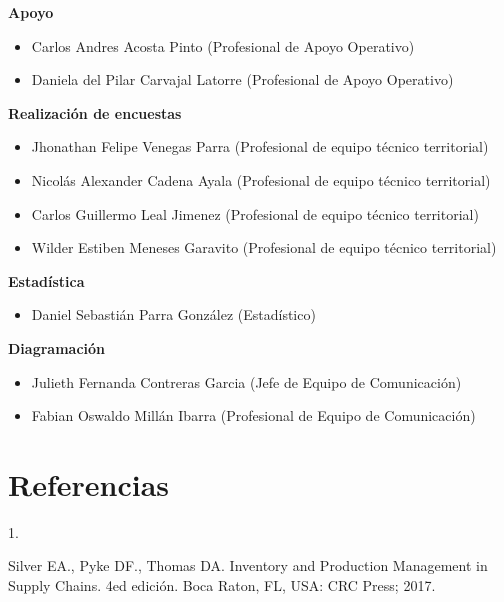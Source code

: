 \documentclass[
]{book}
\newlength{\cslhangindent}
\newlength{\csllabelwidth}
\newlength{\cslentryspacingunit} %
\newenvironment{CSLReferences}[2] %
 {%
  \setlength{\parindent}{0pt}
  \ifodd #1
  \let\oldpar\par
  \def\par{\hangindent=\cslhangindent\oldpar}
  \fi
  \setlength{\parskip}{#2\cslentryspacingunit}
 }%
 {}
\newcommand{\CSLLeftMargin}[1]{\parbox[t]{\csllabelwidth}{#1}}
\newcommand{\CSLRightInline}[1]{\parbox[t]{\linewidth - \csllabelwidth}{#1}\break}
\begin{document}
\textbf{Apoyo}

\begin{itemize}\item  Carlos Andres Acosta Pinto (Profesional de Apoyo Operativo)\item  Daniela del Pilar Carvajal Latorre (Profesional de Apoyo Operativo)\end{itemize}

\textbf{Realización de encuestas}

\begin{itemize}\item  Jhonathan Felipe Venegas Parra (Profesional de equipo técnico territorial)\item  Nicolás Alexander Cadena Ayala (Profesional de equipo técnico territorial)\item  Carlos Guillermo Leal Jimenez (Profesional de equipo técnico territorial)\item  Wilder Estiben Meneses Garavito (Profesional de equipo técnico territorial)\end{itemize}

\textbf{Estadística}

\begin{itemize}\item  Daniel Sebastián Parra González (Estadístico)\end{itemize}

\textbf{Diagramación}

\begin{itemize}\item  Julieth Fernanda Contreras Garcia (Jefe de Equipo de Comunicación)\item  Fabian Oswaldo Millán Ibarra (Profesional de Equipo de Comunicación)\end{itemize}

\hypertarget{referencias}{%
\chapter*{Referencias}\label{referencias}}

\hypertarget{refs}{}
\begin{CSLReferences}{0}{0}
\leavevmode{}%
\CSLLeftMargin{1. }
\CSLRightInline{Silver EA., Pyke DF., Thomas DA. {Inventory and Production Management in Supply Chains}. 4ed edición. Boca Raton, FL, USA: CRC Press; 2017.}

\end{CSLReferences}
\end{document}
